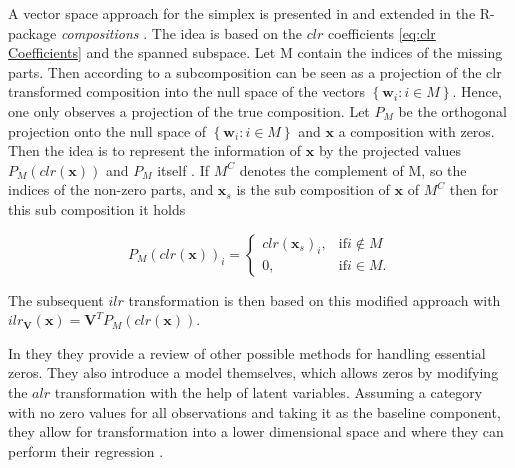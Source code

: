 A vector space approach for the simplex is presented in \cite{Boogaart:2006} and extended in the R-package \textit{compositions} \cite{Compositions:2023}. The idea is based on the $clr$ coefficients \ref{eq:clr Coefficients} and the spanned subspace. Let M contain the indices of the missing parts. Then according to \cite{Egozcue:2005} a subcomposition can be seen as a projection of the clr transformed composition into the null space of the vectors $\left\{\bm{w}_i: i \in M\right\}$. Hence, one only observes a projection of the true composition. Let $P_M$ be the orthogonal projection onto the null space of $\left\{\bm{w}_i: i \in M\right\}$ and $\bm{x}$ a composition with zeros. Then the idea is to represent the information of $\bm{x}$ by the projected values $P_M(clr(\bm{x}))$ and $P_M$ itself \cite{Boogaart:2006}. If $M^C$ denotes the complement of M, so the indices of the non-zero parts, and $\bm{x}_s$ is the sub composition of $\bm{x}$ of $M^C$ then for this sub composition it holds 

\begin{equation}
P_M(clr(\bm{x}))_i =
\begin{cases}
clr(\bm{x}_s)_i, & \text{if} i \notin M \\
0, & \text{if} i \in M.
\end{cases}
\label{eq:clr Projection}
\end{equation}

The subsequent $ilr$ transformation is then based on this modified approach with $ ilr_{\textbf{V}}(\textbf{x}) = \textbf{V}^T P_M(clr(\textbf{x}))$.

In \cite{Leininger:2013} they  they provide a review of other possible methods for handling essential zeros. They also introduce a model themselves, which allows zeros by modifying the $alr$ transformation with the help of latent variables. Assuming a category with no zero values for all observations and taking it as the baseline component, they allow for transformation into a lower dimensional space and where they can perform their regression \cite{Leininger:2013}.

